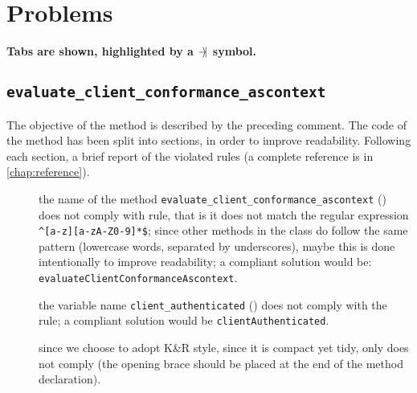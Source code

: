 \chapter{Problems}




\lipsum[1]


\textbf{Tabs are shown, highlighted by a $-\hspace{-0.4em}\rangle\hspace{-0.2em}|$ symbol.} %

\section{\normalfont\texttt{evaluate\_client\_conformance\_ascontext}}

The objective of the method is described by the preceding comment. The code of the method has been split into sections, in order to improve readability. Following each section, a brief report of the violated rules (a complete reference is in \cref{chap:reference}).


\begin{description}
	
	\item []
		the name of the method \verb|evaluate_client_conformance_ascontext| () does not comply with rule, that is it does not match the regular expression \verb|^[a-z][a-zA-Z0-9]*$|; since other methods in the class do follow the same pattern (lowercase words, separated by underscores), maybe this is done intentionally to improve readability; a compliant solution would be: \texttt{evaluateClientConformanceAscontext}. %
	
	\item []
		the variable name \verb|client_authenticated| () does not comply with the rule; a compliant solution would be \verb|clientAuthenticated|. 
	
	\item []
		since we choose to adopt K\&R style, since it is compact yet tidy, only  does not comply (the opening brace should be placed at the end of the method declaration).
		
\end{description}

